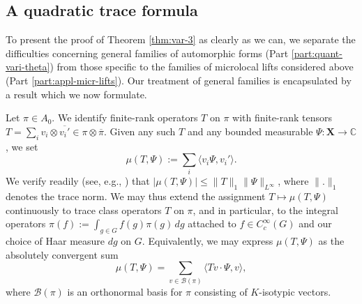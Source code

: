 \documentclass[reqno,10pt]{amsart}
\theoremstyle{plain} %
\theoremstyle{definition}
\theoremstyle{plain} %
\theoremstyle{remark}
\theoremstyle{itplain} %
\theoremstyle{remark} %
\renewcommand{\leq}{\leqslant}
\numberwithin{equation}{section}
\begin{document}
\subsection{A quadratic trace formula}\label{sec:orgb2d0a08}
To present the proof of Theorem \ref{thm:var-3} as clearly as we can, we separate the difficulties concerning general families of automorphic forms (Part \ref{part:quant-vari-theta}) from those specific to the families of microlocal lifts considered above (Part \ref{part:appl-micr-lifts}).  Our treatment of general families is encapsulated by a result which we now formulate.

Let $\pi \in A_0$.  We identify finite-rank operators $T$ on $\pi$ with finite-rank tensors $T = \sum_i v_i \otimes \overline{v_i'} \in \pi \otimes \overline{\pi}$.  Given any such $T$ and any bounded measurable $\Psi : \mathbf{X} \rightarrow \mathbb{C}$, we set
\[
  \mu(T,\Psi) := \sum_i \langle v_i \Psi, v_i' \rangle.
\]
We verify readily (see, e.g., \cite[\S26.3]{nelson-venkatesh-1}) that $|\mu(T,\Psi)| \leq \|T\|_1 \|\Psi \|_{L^\infty}$, where $\|.\|_1$ denotes the trace norm.  We may thus extend the assignment $T \mapsto \mu(T,\Psi)$ continuously to trace class operators $T$ on $\pi$, and in particular, to the integral operators $\pi(f) := \int_{g \in G} f(g) \pi(g) \, d g$ attached to $f \in C_c^\infty(G)$ and our choice of Haar measure $d g$ on $G$.  Equivalently, we may express $\mu(T,\Psi)$ as the absolutely convergent sum
\[
  \mu(T,\Psi) = \sum_{v \in \mathcal{B}(\pi)} \langle T v \cdot \Psi, v \rangle,
\]
where $\mathcal{B}(\pi)$ is an orthonormal basis for $\pi$ consisting of $K$-isotypic vectors.
\end{document}
